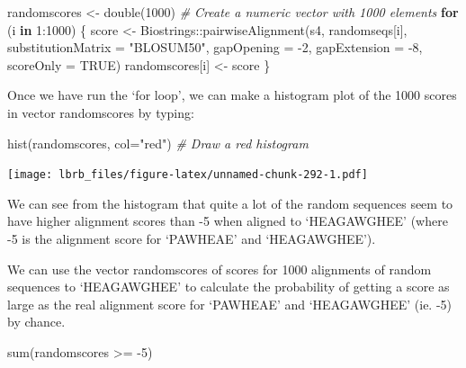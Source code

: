 \documentclass[
]{book}
\newenvironment{Shaded}{\begin{snugshade}}{\end{snugshade}}
\newcommand{\AttributeTok}[1]{\textcolor[rgb]{0.77,0.63,0.00}{#1}}
\newcommand{\CommentTok}[1]{\textcolor[rgb]{0.56,0.35,0.01}{\textit{#1}}}
\newcommand{\ConstantTok}[1]{\textcolor[rgb]{0.00,0.00,0.00}{#1}}
\newcommand{\ControlFlowTok}[1]{\textcolor[rgb]{0.13,0.29,0.53}{\textbf{#1}}}
\newcommand{\DecValTok}[1]{\textcolor[rgb]{0.00,0.00,0.81}{#1}}
\newcommand{\FunctionTok}[1]{\textcolor[rgb]{0.00,0.00,0.00}{#1}}
\newcommand{\NormalTok}[1]{#1}
\newcommand{\OtherTok}[1]{\textcolor[rgb]{0.56,0.35,0.01}{#1}}
\newcommand{\SpecialCharTok}[1]{\textcolor[rgb]{0.00,0.00,0.00}{#1}}
\newcommand{\StringTok}[1]{\textcolor[rgb]{0.31,0.60,0.02}{#1}}
\begin{document}
\begin{Shaded}
\begin{Highlighting}[]
\NormalTok{randomscores }\OtherTok{\textless{}{-}} \FunctionTok{double}\NormalTok{(}\DecValTok{1000}\NormalTok{) }\CommentTok{\# Create a numeric vector with 1000 elements}
\ControlFlowTok{for}\NormalTok{ (i }\ControlFlowTok{in} \DecValTok{1}\SpecialCharTok{:}\DecValTok{1000}\NormalTok{)}
\NormalTok{\{}
\NormalTok{  score }\OtherTok{\textless{}{-}}\NormalTok{ Biostrings}\SpecialCharTok{::}\FunctionTok{pairwiseAlignment}\NormalTok{(s4, randomseqs[i], }\AttributeTok{substitutionMatrix =} \StringTok{"BLOSUM50"}\NormalTok{,}
                             \AttributeTok{gapOpening =} \SpecialCharTok{{-}}\DecValTok{2}\NormalTok{, }\AttributeTok{gapExtension =} \SpecialCharTok{{-}}\DecValTok{8}\NormalTok{, }\AttributeTok{scoreOnly =} \ConstantTok{TRUE}\NormalTok{)}
\NormalTok{  randomscores[i] }\OtherTok{\textless{}{-}}\NormalTok{ score}
\NormalTok{\}}
\end{Highlighting}
\end{Shaded}

Once we have run the `for loop', we can make a histogram plot of the 1000 scores in vector randomscores by typing:

\begin{Shaded}
\begin{Highlighting}[]
\FunctionTok{hist}\NormalTok{(randomscores, }\AttributeTok{col=}\StringTok{"red"}\NormalTok{) }\CommentTok{\# Draw a red histogram}
\end{Highlighting}
\end{Shaded}

\texttt{[image: lbrb\_files/figure-latex/unnamed-chunk-292-1.pdf]}

We can see from the histogram that quite a lot of the random sequences seem to have higher alignment scores than -5 when aligned to `HEAGAWGHEE' (where -5 is the alignment score for `PAWHEAE' and `HEAGAWGHEE').

We can use the vector randomscores of scores for 1000 alignments of random sequences to `HEAGAWGHEE' to calculate the probability of getting a score as large as the real alignment score for `PAWHEAE' and `HEAGAWGHEE' (ie. -5) by chance.

\begin{Shaded}
\begin{Highlighting}[]
\FunctionTok{sum}\NormalTok{(randomscores }\SpecialCharTok{\textgreater{}=} \SpecialCharTok{{-}}\DecValTok{5}\NormalTok{)}
\end{Highlighting}
\end{Shaded}
\end{document}
